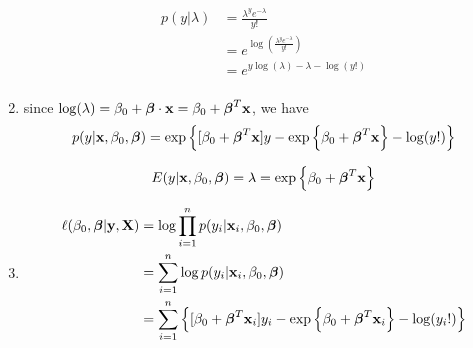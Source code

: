 \documentclass{article}
\newcommand{\vect}[1]{\boldsymbol{#1}}
\newcommand{\vectrm}[1]{\boldsymbol{\rm #1}}
\begin{document}
\begin{enumerate}[label=(\alph*)]
    \begin{align*}
      p(y | \lambda) &= \frac{\lambda^y e^{-\lambda}}{y!} \\
      &= e^{\log(\frac{\lambda^y e^{-\lambda}}{y!})} \\
      &= e^{y \log(\lambda) - \lambda - \log(y!)} \\
    \end{align*}

  \item
    since \(\log(\lambda) = \beta_0 + \vect{\beta}\cdot \vect{\rm x} = \beta_0 + \vect \beta^T \vectrm{x}\), we have
    \[
      p(y| \vectrm{x}, \beta_0, \vect{\beta}) = \exp\left\{ [\beta_0 + \vect{\beta}^T \vectrm{x}]y -
        \exp\left\{
          \beta_0 + \vect{\beta}^T \vectrm{x}
        \right\}
      - \log(y!)\right\}
    \]

    \[E(y| \vectrm{x}, \beta_0, \vect{\beta}) = \lambda =
      \exp\left\{
        \beta_0 + \vect{\beta}^T \vectrm{x}
      \right\}
    \]
  \item
    \begin{align*}
      \ell(\beta_0, \vect{\beta}| \vectrm{y}, \vectrm{X}) &= \log \prod_{i=1}^{n} p(y_i| \vectrm{x}_i, \beta_0, \vect{\beta}) \\
      &= \sum_{i=1}^{n} \log p(y_i| \vectrm{x}_i, \beta_0, \vect{\beta}) \\
        &= \sum_{i=1}^{n} \left\{ [\beta_0 + \vect{\beta}^T \vectrm{x}_i]y_i -
            \exp\left\{
            \beta_0 + \vect{\beta}^T \vectrm{x}_i
            \right\}
            - \log(y_i!)\right\} \\
    \end{align*}
\end{enumerate}
\end{document}
